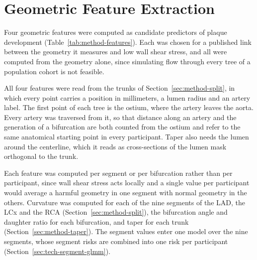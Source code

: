 \section{Geometric Feature Extraction}
\label{sec:method-features}

Four geometric features were computed as candidate predictors of plaque development (Table~\ref{tab:method-features}).
Each was chosen for a published link between the geometry it measures and low wall shear stress, and all were computed from the geometry alone, since simulating flow through every tree of a population cohort is not feasible.

All four features were read from the trunks of Section~\ref{sec:method-split}, in which every point carries a position in millimeters, a lumen radius and an artery label.
The first point of each tree is the ostium, where the artery leaves the aorta.
Every artery was traversed from it, so that distance along an artery and the generation of a bifurcation are both counted from the ostium and refer to the same anatomical starting point in every participant.
Taper also needs the lumen around the centerline, which it reads as cross-sections of the lumen mask orthogonal to the trunk.

Each feature was computed per segment or per bifurcation rather than per participant, since wall shear stress acts locally and a single value per participant would average a harmful geometry in one segment with normal geometry in the others.
Curvature was computed for each of the nine segments of the LAD, the LCx and the RCA (Section~\ref{sec:method-split}), the bifurcation angle and daughter ratio for each bifurcation, and taper for each trunk (Section~\ref{sec:method-taper}).
The segment values enter one model over the nine segments, whose segment risks are combined into one risk per participant (Section~\ref{sec:tech-segment-glmm}).


